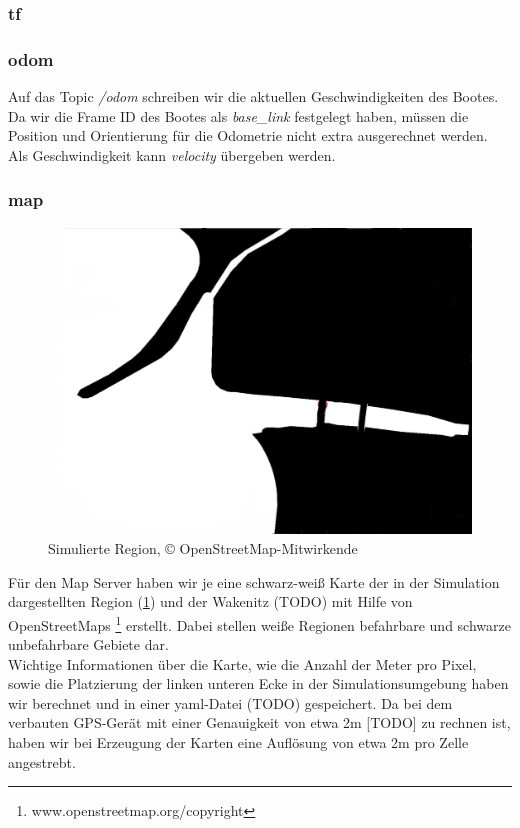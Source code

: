\documentclass[conference]{IEEEtran}
\begin{document}
\subsubsection{tf}
\subsubsection{odom}
Auf das Topic \textit{/odom} schreiben wir die aktuellen Geschwindigkeiten des Bootes. Da wir die Frame ID des Bootes als \textit{base\_link} festgelegt haben, müssen die Position und Orientierung für die Odometrie nicht extra ausgerechnet werden. Als Geschwindigkeit kann \textit{velocity} übergeben werden.
\subsubsection{map}
\begin{figure}
	\includegraphics[width=\linewidth]{diluvio.jpg}
	\caption{Simulierte Region, © OpenStreetMap-Mitwirkende}
	\label{diluvio}
\end{figure}
Für den Map Server haben wir je eine schwarz-weiß Karte der in der Simulation dargestellten Region (\ref{diluvio}) und der Wakenitz (TODO) mit Hilfe von OpenStreetMaps \footnote{www.openstreetmap.org/copyright } erstellt. Dabei stellen weiße Regionen befahrbare und schwarze unbefahrbare Gebiete dar.\\
Wichtige Informationen über die Karte, wie die Anzahl der Meter pro Pixel, sowie die Platzierung der linken unteren Ecke in der Simulationsumgebung haben wir berechnet und in einer yaml-Datei (TODO) gespeichert. Da bei dem verbauten GPS-Gerät mit einer Genauigkeit von etwa 2m [TODO] zu rechnen ist, haben wir bei Erzeugung der Karten eine Auflösung von etwa 2m pro Zelle angestrebt.
\end{document}
